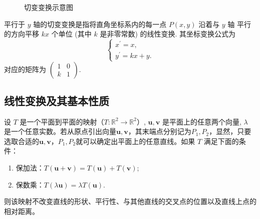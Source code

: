 \begin{figure}[h]
\centering
{}
\caption{切变变换示意图\label{fig:切变变换}}
\end{figure}

\begin{exercise}

    平行于 $y$ 轴的切变变换是指将直角坐标系内的每一点 $P(x, y)$ 沿着与 $y$ 轴 平行的方向平移 $k x$ 个单位 (其中 $k$ 是非零常数) 的线性变换. 其坐标变换公式为
    $$
    \left\{\begin{array}{c}
    x^{\prime}=x, \\
    y^{\prime}=k x+y .
    \end{array}\right.
    $$
    对应的矩阵为 $\left(\begin{array}{ll}1 & 0 \\ k & 1\end{array}\right)$.
        
\end{exercise}

\subsection{线性变换及其基本性质}

\begin{proposition}[平面上保持直线性质的变换]
\label{thm:保持直线性质的变换}
设 $T$ 是一个平面到平面的映射（$T: \mathbb{R}^2 \rightarrow \mathbb{R}^2$）, $\boldsymbol{u}, \boldsymbol{v}$ 是平面上的任意两个向量, $\lambda$ 是一个任意实数。若从原点引出向量$\boldsymbol{u}, \boldsymbol{v}$，其末端点分别记为$P_1,P_2$，显然，只要选取合适的$\boldsymbol{u}, \boldsymbol{v}$，$P_1,P_2$就可以确定出平面上的任意直线。如果 $T$ 满足下面的条件：
\begin{enumerate}
    \item 保加法：$T(\boldsymbol{u}+\boldsymbol{v}) = T(\boldsymbol{u})+T(\boldsymbol{v})$;
    \item 保数乘：$T(\lambda \boldsymbol{u}) =\lambda T(\boldsymbol{u})$.
\end{enumerate}
则该映射不改变直线的形状、平行性、与其他直线的交叉点的位置以及直线上点的相对距离。
\end{proposition}

